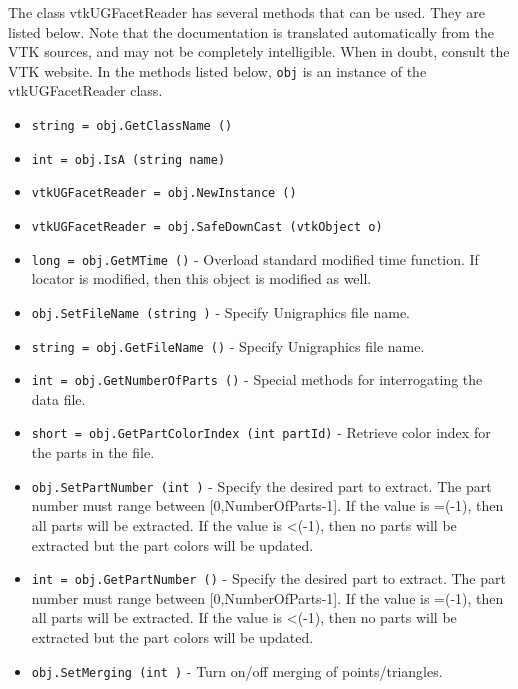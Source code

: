 The class vtkUGFacetReader has several methods that can be used.
  They are listed below.
Note that the documentation is translated automatically from the VTK sources,
and may not be completely intelligible.  When in doubt, consult the VTK website.
In the methods listed below, \verb|obj| is an instance of the vtkUGFacetReader class.
\begin{itemize}
\item  \verb|string = obj.GetClassName ()|

\item  \verb|int = obj.IsA (string name)|

\item  \verb|vtkUGFacetReader = obj.NewInstance ()|

\item  \verb|vtkUGFacetReader = obj.SafeDownCast (vtkObject o)|

\item  \verb|long = obj.GetMTime ()| -  Overload standard modified time function. If locator is modified,
 then this object is modified as well.

\item  \verb|obj.SetFileName (string )| -  Specify Unigraphics file name.

\item  \verb|string = obj.GetFileName ()| -  Specify Unigraphics file name.

\item  \verb|int = obj.GetNumberOfParts ()| -  Special methods for interrogating the data file.

\item  \verb|short = obj.GetPartColorIndex (int partId)| -  Retrieve color index for the parts in the file.

\item  \verb|obj.SetPartNumber (int )| -  Specify the desired part to extract. The part number must range between
 [0,NumberOfParts-1]. If the value is =(-1), then all parts will be 
 extracted. If the value is <(-1), then no parts will be  extracted but 
 the part colors will be updated.

\item  \verb|int = obj.GetPartNumber ()| -  Specify the desired part to extract. The part number must range between
 [0,NumberOfParts-1]. If the value is =(-1), then all parts will be 
 extracted. If the value is <(-1), then no parts will be  extracted but 
 the part colors will be updated.

\item  \verb|obj.SetMerging (int )| -  Turn on/off merging of points/triangles.


\end{itemize}
